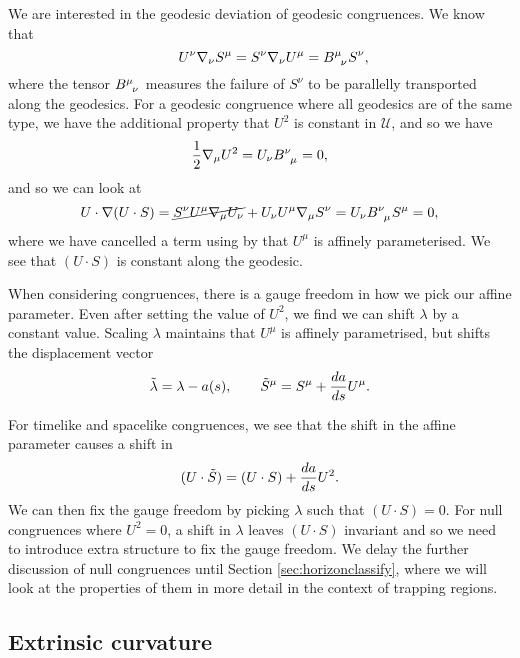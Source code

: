 We are interested in the geodesic deviation of geodesic congruences. We know that
\begin{equation*}
	\qquad U^\nu \nabla_\nu S^\mu = S^\nu \nabla_\nu U^\mu = \tensor{B}{^\mu_\nu} S^\nu ,
\end{equation*}
where the tensor $\tensor{B}{^\mu_\nu}$ measures the failure of $S^\nu$ to be parallelly transported along the geodesics. For a geodesic congruence where all geodesics are of the same type, we have the additional property that $U^2$ is constant in $\mathcal{U}$, and so we have
\begin{equation*}
	\half \nabla_\mu U^2 = U_\nu \tensor{B}{^\nu_\mu} = 0,
\end{equation*}
and so we can look at 
\begin{equation*}
	U \cdot \nabla (U \cdot S) = \cancel{S^\nu U^\mu \nabla_\mu U_\nu} + U_\nu U^\mu \nabla_\mu S^\nu = U_\nu \tensor{B}{^\nu_\mu} S^\mu = 0,
\end{equation*}
where we have cancelled a term using by that $U^\mu$ is affinely parameterised. We see that $(U \cdot S)$ is constant along the geodesic.

When considering congruences, there is a gauge freedom in how we pick our affine parameter. Even after setting the value of $U^2$, we find we can shift $\lambda$ by a constant value. Scaling $\lambda$ maintains that $U^\mu$ is affinely parametrised, but shifts the displacement vector
\begin{equation*}
	\tilde{\lambda} = \lambda - a(s), \qquad \tilde{S}^\mu = S^\mu + \frac{d a}{d s} U^\mu.
\end{equation*} 

For timelike and spacelike congruences, we see that the shift in the affine parameter causes a shift in 
\begin{equation*}
	(U \cdot \tilde{S}) = (U \cdot S) + \frac{d a}{d s} U^2.
\end{equation*}
We can then fix the gauge freedom by picking $\lambda$ such that $(U \cdot S) = 0$. For null congruences where $U^2 = 0$, a shift in $\lambda$ leaves $(U \cdot S)$ invariant and so we need to introduce extra structure to fix the gauge freedom. We delay the further discussion of null congruences until Section \ref{sec:horizonclassify}, where we will look at the properties of them in more detail in the context of trapping regions.


\subsection{Extrinsic curvature}
\label{sec:extrinsic}

